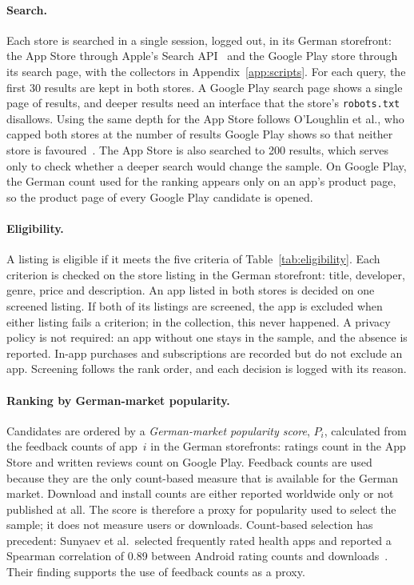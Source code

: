 \paragraph{Search.} Each store is searched in a single session, logged out, in
its German storefront: the App Store through Apple's Search
API~\parencite{apple2022itunessearch} and the Google Play store through its
search page, with the collectors in Appendix~\ref{app:scripts}. For each query,
the first 30 results are kept in both stores. A Google Play search page shows
a single page of results, and deeper results need an interface that the store's
\texttt{robots.txt} disallows. Using the same depth for the App Store follows
O'Loughlin et al., who capped both stores at the number of results Google Play
shows so that neither store is favoured~\parencite{oloughlin2019reviewing}. The
App Store is also searched to 200 results, which serves only to check whether
a deeper search would change the sample. On Google Play, the German count used
for the ranking appears only on an app's product page, so the product page of
every Google Play candidate is opened.

\paragraph{Eligibility.} A listing is eligible if it meets the five criteria
of Table~\ref{tab:eligibility}. Each criterion is checked on the store listing
in the German storefront: title, developer, genre, price and description. An
app listed in both stores is decided on one screened listing. If both of its
listings are screened, the app is excluded when either listing fails a
criterion; in the collection, this never happened. A privacy policy is not
required: an app
without one stays in the sample, and the absence is reported. In-app purchases
and subscriptions are recorded but do not exclude an app. Screening follows the
rank order, and each decision is logged with its reason.

\paragraph{Ranking by German-market popularity.} Candidates are ordered by a
\emph{German-market popularity score}, $P_i$, calculated from the feedback
counts of app~$i$ in the German storefronts: ratings count in the App Store and
written reviews count on Google Play. Feedback counts are used because they are the
only count-based measure that is available for the German market. Download and
install counts are either reported worldwide only or not published at all.
The score is
therefore a proxy for popularity used to select the sample; it does not measure
users or downloads. Count-based selection has precedent: Sunyaev et
al.\ selected frequently rated health apps and reported a Spearman correlation
of 0.89 between Android rating counts and downloads~\parencite{sunyaev2015availability}.
Their finding supports the use of feedback counts as a proxy.

